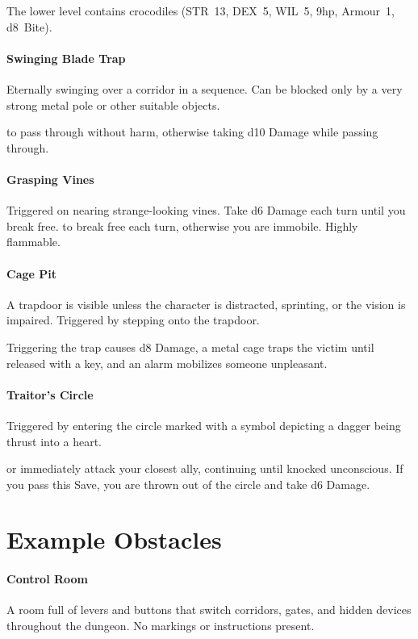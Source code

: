 \documentclass[itdr]{subfiles}
\begin{document}
The lower level contains crocodiles (STR~13, DEX~5, WIL~5, 9hp, Armour~1, d8~Bite).

\vfill
\paragraph{Swinging Blade Trap}
Eternally swinging over a corridor in a sequence. Can be blocked only by a very strong metal pole or other suitable objects.

 to pass through without harm, otherwise taking d10 Damage while passing through.

\vfill
\paragraph{Grasping Vines}
Triggered on nearing strange-looking vines. Take d6 Damage each turn until you break free.  to break free each turn, otherwise you are immobile. Highly flammable.

\vfill
\paragraph{Cage Pit}
A trapdoor is visible unless the character is distracted, sprinting, or the vision is impaired. Triggered by stepping onto the trapdoor.

Triggering the trap causes d8 Damage, a metal cage traps the victim until released with a key, and an alarm mobilizes someone unpleasant.

\vfill
\paragraph{Traitor's Circle}
Triggered by entering the circle marked with a symbol depicting a dagger being thrust into a heart.

 or immediately attack your closest ally, continuing until knocked unconscious. If you pass this Save, you are thrown out of the circle and take d6 Damage.

\vfill
\break

\section{Example Obstacles}

\paragraph{Control Room}
A room full of levers and buttons that switch corridors, gates, and hidden devices throughout the dungeon. No markings or instructions present.
\end{document}
